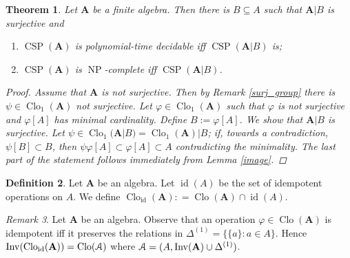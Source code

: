\documentclass{amsart}
\theoremstyle{plain}
\newtheorem{theorem}{Theorem}[section]
\theoremstyle{definition}
\newtheorem{definition}[theorem]{Definition}
\theoremstyle{remark}
\newtheorem{remark}[theorem]{Remark}
\def\phi{\varphi}
\DeclareMathOperator{\Clo}{Clo}
\DeclareMathOperator{\CSP}{CSP}
\DeclareMathOperator{\Inv}{Inv}
\DeclareMathOperator{\NP}{NP}
\DeclareMathOperator{\id}{id}
\begin{document}
\begin{theorem}
    Let $\mathbf{A}$ be a finite algebra. 
    Then there is $B \subseteq A$ such that $\mathbf{A}|B$ is surjective and 
    \begin{enumerate}
        \item $\CSP(\mathbf{A})$ is polynomial-time decidable iff $\CSP(\mathbf{A}|B)$ is; 
        \item $\CSP(\mathbf{A})$ is $\NP$-complete iff $\CSP(\mathbf{A}|B)$.
    \end{enumerate}
    \begin{proof}
        Assume that $\mathbf{A}$ is not surjective. 
        Then by Remark \ref{surj_group} there is $\psi \in \Clo_1(\mathbf{A})$ not surjective. 
        Let $\phi \in \Clo_1(\mathbf{A})$ such that $\phi$ is not surjective and $\phi[A]$ has minimal cardinality. 
        Define $B:=\phi[A]$. 
        We show that $\mathbf{A}|B$ is surjective. 
        Let $\psi \in \Clo_1(\mathbf{A}|B) = \Clo_1(\mathbf{A})|B $;
        if, towards a contradiction, $\psi[B] \subset B$, then $\psi \phi [A] \subset \phi[A] \subset A$ contradicting the minimality. 
        The last part of the statement follows immediately from Lemma \ref{image}. 
    \end{proof}
\end{theorem}


\begin{definition}
    Let $\mathbf{A}$ be an algebra. 
    Let $\id(A)$ be the set of idempotent operations on $A$. 
    We define $\Clo_{\id}(\mathbf{A}): = \Clo(\mathbf{A}) \cap \id(A)$. 
\end{definition}

\begin{remark}
    \label{idempotent}
    Let $\mathbf{A}$ be an algebra.  
    Observe that an operation $\phi \in \Clo(\mathbf{A})$ is idempotent iff it preserves the relations in $\Delta^{(1)}=\{\{a\} : a \in A\}$. 
    Hence $\Inv(\Clo_{\id}(\mathbf{A})) = \Clo(\EuScript{A})$ where $\EuScript{A}=(A, \Inv(\mathbf{A}) \cup \Delta^{(1)})$. 
\end{remark}
\end{document}
